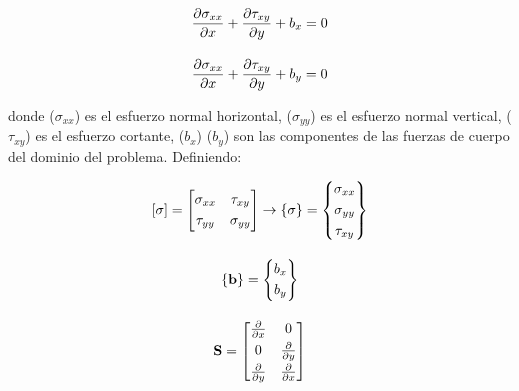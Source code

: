 \begin{ceqn} 
\begin{subequations} \label{eq:equ31} 
\begin{gather}
\normalsize{\frac{\partial\sigma_{xx}}{\partial x} + \frac{\partial\tau_{xy}}{\partial y} + b_x = 0} \label{eq:equ31a} \\[10pt]
\normalsize{\frac{\partial\sigma_{xx}}{\partial x} + \frac{\partial\tau_{xy}}{\partial y} + b_y = 0} \label{eq:equ31b} 
\end{gather}  
\end{subequations} 
\end{ceqn}
donde ($\sigma_{xx}$) es el esfuerzo normal horizontal, ($\sigma_{yy}$) es el esfuerzo normal vertical, ($\tau_{xy}$) es el esfuerzo cortante, ($b_{x}$) ($b_{y}$) son las componentes de las fuerzas de cuerpo del dominio del problema. Definiendo:
\begin{ceqn} 
\begin{subequations} \label{eq:equ32} 
\begin{gather}
\normalsize{[\mathbf{\sigma}] = \begin{bmatrix}
       \sigma_{xx} & \tau_{xy}\\[0.3em]
       \tau_{yy} & \sigma_{yy}
       \end{bmatrix} \rightarrow 
       \{\mathbf{\sigma}\} = \begin{Bmatrix} 
       \sigma_{xx}\\[0.3em]
       \sigma_{yy}\\[0.3em]
       \tau_{xy}
       \end{Bmatrix}} \label{eq:equ32a} \\[10pt]
\normalsize{ \{\mathbf{b}\} = \begin{Bmatrix}
       b_{x} \\[0.3em]
       b_{y}
       \end{Bmatrix}} \label{eq:equ32b} \\[10pt]
\normalsize{\mathbf{S} = \begin{bmatrix}
       \frac{\partial}{\partial x} & 0\\[0.3em]
       0 & \frac{\partial}{\partial y}\\[0.3em]
       \frac{\partial}{\partial y} & \frac{\partial}{\partial x}
       \end{bmatrix}} \label{eq:equ32c} 
\end{gather}  
\end{subequations} 
\end{ceqn}

